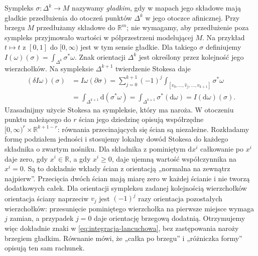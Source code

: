 \documentclass[11pt,a4paper,oneside]{report}
\newcommand{\R}{\mathbb{R}}
\newcommand{\dd}{\mathrm d}
\theoremstyle{plain}
\theoremstyle{definition}
\theoremstyle{remark}
\begin{document}
Sympleks $\sigma:\Delta^k\to M$ nazywamy \emph{gładkim},
gdy w mapach jego składowe mają gładkie przedłużenia
do otoczeń punktów $\Delta^k$ w jego otoczce afinicznej.
Przy brzegu $M$ przedłużamy składowe do $\R^m$;
nie wymagamy, aby przedłużenie poza sympleks przyjmowało
wartości w półprzestrzeni modelującej $M$.
Na przykład $t\mapsto t$ z $[0,1]$ do $[0,\infty)$
jest w tym sensie gładkie. Dla takiego $\sigma$ definiujemy
$I(\omega)(\sigma)=\int_{\Delta^k}\sigma^*\omega$.
Znak orientacji $\Delta^k$ jest określony przez
kolejność jego wierzchołków. Na sympleksie
$\Delta^{k+1}$ twierdzenie Stokesa daje
\begin{equation}\label{eq:integracja-lancuchowa}
 \begin{aligned}
 (\delta I\omega)(\sigma)
 &= I\omega(\partial\sigma)
  =\sum_{j=0}^{k+1}(-1)^j
      \int_{[v_0,\ldots,\widehat v_j,\ldots,v_{k+1}]}
          \sigma^*\omega \\
 &=\int_{\Delta^{k+1}}\dd(\sigma^*\omega)
  =\int_{\Delta^{k+1}}\sigma^*(\dd\omega)
  =I(\dd\omega)(\sigma).
 \end{aligned}
\end{equation}
Uzasadnijmy użycie Stokesa na sympleksie, który ma naroża.
W otoczeniu punktu należącego do $r$ ścian jego dziedzinę
opisują współrzędne
$[0,\infty)^r\times\R^{k+1-r}$: równania przecinających
się ścian są niezależne. Rozkładamy formę podziałem
jedności i stosujemy lokalny dowód Stokesa do każdego
składnika o zwartym nośniku. Dla składnika z pominiętym
$\dd x^i$ całkowanie po $x^i$ daje zero, gdy $x^i\in\R$,
a gdy $x^i\geq0$, daje ujemną wartość współczynnika
na $x^i=0$. Są to dokładnie wkłady ścian z orientacją
„normalna na zewnątrz najpierw”. Przecięcia dwóch ścian
mają miarę zero w każdej ścianie i nie tworzą dodatkowych
całek. Dla orientacji sympleksu zadanej kolejnością
wierzchołków orientacja ściany naprzeciw $v_j$ jest
$(-1)^j$ razy orientacja pozostałych wierzchołków:
przesunięcie pominiętego wierzchołka na pierwsze miejsce
wymaga $j$ zamian, a przypadek $j=0$ daje orientację
brzegową dodatnią. Otrzymujemy więc dokładnie znaki
w \eqref{eq:integracja-lancuchowa}, bez zastępowania
naroży brzegiem gładkim.
Równanie mówi, że „całka po brzegu” i „różniczka
formy” opisują ten sam rachunek.
\end{document}
